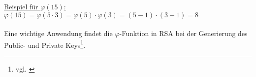 \underline{Beispiel für $\varphi(15)$:}\\
$\varphi(15)=\varphi(5\cdot3)=\varphi(5)\cdot\varphi(3)=(5-1)\cdot(3-1)=8$
\\
\\
Eine wichtige Anwendung findet die $\varphi$-Funktion in RSA bei der Generierung des Public- und Private Keys\footnote{vgl. \cite{euler_phi}}.
